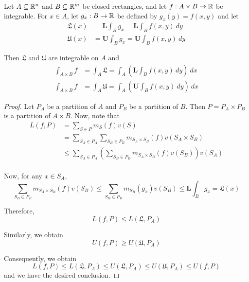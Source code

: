 \begin{theorem}[Fubini]
    Let $A\subseteq\mathbb{R}^n$ and $B\subseteq\mathbb{R}^m$ be closed rectangles, and let $f:A\times B\to\mathbb{R}$ be integrable. For $x\in A$, let $g_x:B\to\mathbb{R}$ be defined by $g_x(y) = f(x,y)$ and let 
    \begin{align*}
        \mathfrak{L}(x) &= \mathbf{L}\int_Bg_x = \mathbf{L}\int_Bf(x,y)~dy\\
        \mathfrak{U}(x) &= \mathbf{U}\int_Bg_x = \mathbf{U}\int_Bf(x,y)~dy
    \end{align*}

    Then $\mathfrak{L}$ and $\mathfrak{U}$ are integrable on $A$ and 
    \begin{align*}
        \int_{A\times B}f &= \int_A\mathfrak{L} = \int_A\left(\mathbf{L}\int_B f(x,y)~dy\right)~dx\\
        \int_{A\times B}f &= \int_A\mathfrak{U} = \int_A\left(\mathbf{U}\int_B f(x,y)~dy\right)~dx
    \end{align*}
\end{theorem}
\begin{proof}
    Let $P_A$ be a partition of $A$ and $P_B$ be a partition of $B$. Then $P = P_A\times P_B$ is a partition of $A\times B$. Now, note that 
    \begin{align*}
        L(f,P) &= \sum_{S\in P}m_S(f)v(S)\\
               &= \sum_{S_A\in P_A}\sum_{S_B\in P_B}m_{S_A\times S_B}(f)v(S_A\times S_B)\\
               &\le\sum_{S_A\in P_A}\left(\sum_{S_B\in P_B}m_{S_A\times S_B}(f)v(S_B)\right)v(S_A)\\
    \end{align*}

    Now, for any $x\in S_A$, 
    \begin{equation*}
        \sum_{S_B\in P_B} m_{S_A\times S_B}(f)v(S_B)\le\sum_{S_B\in P_B}m_{S_B}(g_x)v(S_B)\le\mathbf{L}\int_Bg_x = \mathfrak{L}(x)
    \end{equation*}

    Therefore,
    \begin{equation*}
        L(f,P)\le L(\mathfrak{L},P_A)
    \end{equation*}

    Similarly, we obtain
    \begin{equation*}
        U(f,P)\ge U(\mathfrak{U}, P_A)
    \end{equation*}

    Consequently, we obtain
    \begin{equation*}
        L(f,P)\le L(\mathfrak{L}, P_A)\le U(\mathfrak{L}, P_A)\le U(\mathfrak{U}, P_A)\le U(f,P)
    \end{equation*}
    and we have the desired conclusion.
\end{proof}

